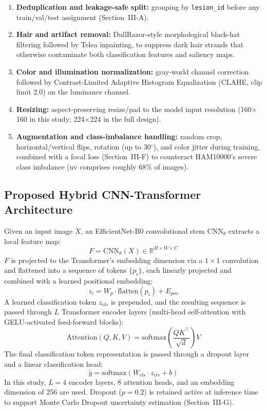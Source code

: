 \documentclass[conference]{IEEEtran}
\begin{document}
\begin{enumerate}
\item \textbf{Deduplication and leakage-safe split:} grouping by \texttt{lesion\_id} before
any train/val/test assignment (Section~III-A).
\item \textbf{Hair and artifact removal:} DullRazor-style morphological black-hat filtering
followed by Telea inpainting, to suppress dark hair strands that otherwise contaminate both
classification features and saliency maps.
\item \textbf{Color and illumination normalization:} gray-world channel correction followed
by Contrast-Limited Adaptive Histogram Equalization (CLAHE, clip limit 2.0) on the
luminance channel.
\item \textbf{Resizing:} aspect-preserving resize/pad to the model input resolution
(160$\times$160 in this study; 224$\times$224 in the full design).
\item \textbf{Augmentation and class-imbalance handling:} random crop, horizontal/vertical
flips, rotation (up to 30$^\circ$), and color jitter during training, combined with a focal
loss (Section~III-F) to counteract HAM10000's severe class imbalance (nv comprises roughly
68\% of images).
\end{enumerate}

\subsection{Proposed Hybrid CNN-Transformer Architecture}

Given an input image $X$, an EfficientNet-B0 \cite{tan2019} convolutional stem
$\mathrm{CNN}_\theta$ extracts a local feature map:
\begin{equation}
F = \mathrm{CNN}_\theta(X) \in \mathbb{R}^{H \times W \times C}
\end{equation}
$F$ is projected to the Transformer's embedding dimension via a $1\times1$ convolution and
flattened into a sequence of tokens $\{p_i\}$, each linearly projected and combined with a
learned positional embedding:
\begin{equation}
z_i = W_p \cdot \mathrm{flatten}(p_i) + E_{pos}
\end{equation}
A learned classification token $z_{cls}$ is prepended, and the resulting sequence is passed
through $L$ Transformer encoder layers (multi-head self-attention with GELU-activated
feed-forward blocks):
\begin{equation}
\mathrm{Attention}(Q,K,V) = \mathrm{softmax}\!\left(\frac{QK^\top}{\sqrt{d}}\right)V
\end{equation}
The final classification token representation is passed through a dropout layer and a
linear classification head:
\begin{equation}
\hat{y} = \mathrm{softmax}(W_{cls} \cdot z_{cls} + b)
\end{equation}
In this study, $L=4$ encoder layers, 8 attention heads, and an embedding dimension of 256
are used. Dropout ($p=0.2$) is retained active at inference time to support Monte Carlo
Dropout uncertainty estimation (Section~III-G).
\end{document}
